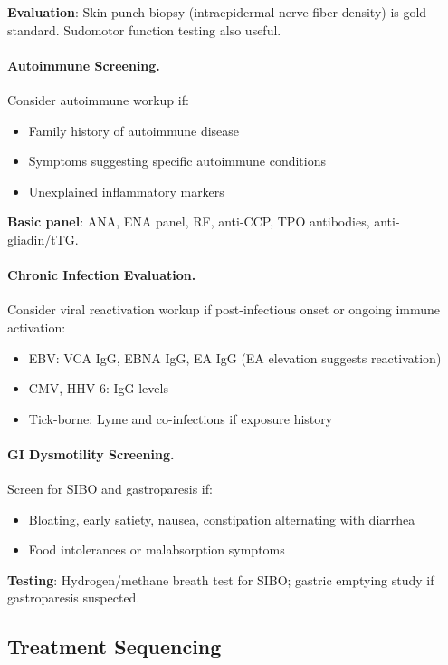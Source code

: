 \textbf{Evaluation}: Skin punch biopsy (intraepidermal nerve fiber density) is gold standard. Sudomotor function testing also useful.

\paragraph{Autoimmune Screening.}
Consider autoimmune workup if:
\begin{itemize}
    \item Family history of autoimmune disease
    \item Symptoms suggesting specific autoimmune conditions
    \item Unexplained inflammatory markers
\end{itemize}

\textbf{Basic panel}: ANA, ENA panel, RF, anti-CCP, TPO antibodies, anti-gliadin/tTG.

\paragraph{Chronic Infection Evaluation.}
Consider viral reactivation workup if post-infectious onset or ongoing immune activation:
\begin{itemize}
    \item EBV: VCA IgG, EBNA IgG, EA IgG (EA elevation suggests reactivation)
    \item CMV, HHV-6: IgG levels
    \item Tick-borne: Lyme and co-infections if exposure history
\end{itemize}

\paragraph{GI Dysmotility Screening.}
Screen for SIBO and gastroparesis if:
\begin{itemize}
    \item Bloating, early satiety, nausea, constipation alternating with diarrhea
    \item Food intolerances or malabsorption symptoms
\end{itemize}

\textbf{Testing}: Hydrogen/methane breath test for SIBO; gastric emptying study if gastroparesis suspected.

\subsection{Treatment Sequencing}

